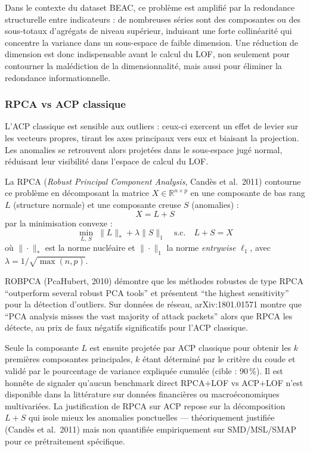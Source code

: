 \documentclass[12pt,a4paper]{article}
\begin{document}
Dans le contexte du dataset BEAC, ce problème est amplifié par la redondance
structurelle entre indicateurs : de nombreuses séries sont des composantes ou
des sous-totaux d'agrégats de niveau supérieur, induisant une forte
collinéarité qui concentre la variance dans un sous-espace de faible dimension.
Une réduction de dimension est donc indispensable avant le calcul du LOF, non
seulement pour contourner la malédiction de la dimensionnalité, mais aussi
pour éliminer la redondance informationnelle.

\subsubsection{RPCA vs ACP classique}

L'ACP classique est sensible aux outliers : ceux-ci exercent un effet de
levier sur les vecteurs propres, tirant les axes principaux vers eux et
biaisant la projection. Les anomalies se retrouvent alors projetées dans le
sous-espace jugé normal, réduisant leur visibilité dans l'espace de calcul
du LOF.

La RPCA (\textit{Robust Principal Component Analysis}, Candès et al.\ 2011)
contourne ce problème en décomposant la matrice $X \in \mathbb{R}^{n \times p}$
en une composante de bas rang $L$ (structure normale) et une composante creuse
$S$ (anomalies) :
$$X = L + S$$
par la minimisation convexe :
$$\min_{L,\,S} \; \|L\|_* + \lambda\|S\|_1
\quad \text{s.c.} \quad L + S = X$$
où $\|\cdot\|_*$ est la norme nucléaire et $\|\cdot\|_1$ la norme
\textit{entrywise} $\ell_1$, avec $\lambda = 1/\sqrt{\max(n,p)}$.

ROBPCA (PcaHubert, 2010) démontre que les méthodes robustes de type RPCA
``outperform several robust PCA tools'' et présentent ``the highest sensitivity''
pour la détection d'outliers. Sur données de réseau, arXiv:1801.01571 montre
que ``PCA analysis misses the vast majority of attack packets'' alors que RPCA
les détecte, au prix de faux négatifs significatifs pour l'ACP classique.

Seule la composante $L$ est ensuite projetée par ACP classique pour obtenir
les $k$ premières composantes principales, $k$ étant déterminé par le critère
du coude et validé par le pourcentage de variance expliquée cumulée (cible :
90\,\%). Il est honnête de signaler qu'aucun benchmark direct RPCA+LOF vs
ACP+LOF n'est disponible dans la littérature sur données financières ou
macroéconomiques multivariées. La justification de RPCA sur ACP repose sur
la décomposition $L + S$ qui isole mieux les anomalies ponctuelles ---
théoriquement justifiée (Candès et al.\ 2011) mais non quantifiée
empiriquement sur SMD/MSL/SMAP pour ce prétraitement spécifique.
\end{document}
